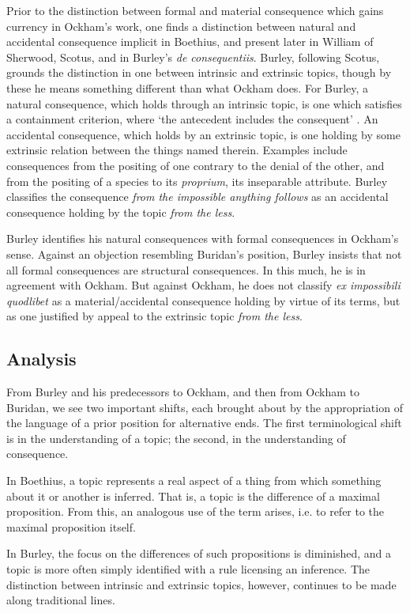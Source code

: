 Prior to the distinction between formal and material consequence which gains currency in Ockham's work, one finds a distinction between natural and accidental consequence implicit in Boethius, and present later in William of Sherwood, Scotus, and in Burley's \textit{de consequentiis}. Burley, following Scotus, grounds the distinction in one between intrinsic and extrinsic topics, though by these he means something different than what Ockham does. For Burley, a natural consequence, which holds through an intrinsic topic, is one which satisfies a containment criterion, where `the antecedent includes the consequent' \cite[p. 61.6-10]{BurleyDPAL}. An accidental consequence, which holds by an extrinsic topic, is one holding by some extrinsic relation between the things named therein. Examples include consequences from the positing of one contrary to the denial of the other, and from the positing of a species to its \textit{proprium}, its inseparable attribute. Burley classifies the consequence \textit{from the impossible anything follows} as an accidental consequence holding by the topic \textit{from the less}. 

Burley identifies his natural consequences with formal consequences in Ockham's sense. Against an objection resembling Buridan's position, Burley insists that not all formal consequences are structural consequences. In this much, he is in agreement with Ockham. But against Ockham, he does not classify \textit{ex impossibili quodlibet} as a material/accidental consequence holding by virtue of its terms, but as one justified by appeal to the extrinsic topic \textit{from the less}.
\subsection{Analysis}
From Burley and his predecessors to Ockham, and then from Ockham to Buridan, we see two important shifts, each brought about by the appropriation of the language of a prior position for alternative ends. The first terminological shift is in the understanding of a topic; the second, in the understanding of consequence.

In Boethius, a topic represents a real aspect of a thing from which something about it or another is inferred. That is, a topic is the difference of a maximal proposition. From this, an analogous use of the term arises, i.e. to refer to the maximal proposition itself.

In Burley, the focus on the differences of such propositions is diminished, and a topic is more often simply identified with a rule licensing an inference. The distinction between intrinsic and extrinsic topics, however, continues to be made along  traditional lines.

